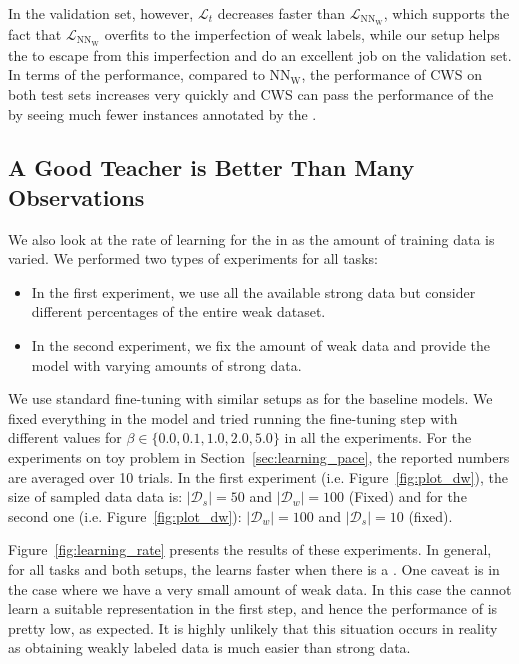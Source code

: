 In the validation set, however, $\mathcal{L}_t$ decreases faster than $\mathcal{L}_{\text{NN}_{\text{W}}}$, which supports the fact that $\mathcal{L}_{\text{NN}_{\text{W}}}$ overfits to the imperfection of weak labels, while our setup helps the \tnet to escape from this imperfection and do an excellent job on the validation set.
%
In terms of the performance, compared to $\text{NN}_{\text{W}}$, the performance of CWS on both test sets increases very quickly and CWS can pass the performance of the \wa by seeing much fewer instances annotated by the \wa.
\subsection{A Good Teacher is Better Than Many Observations} 

We also look at the rate of learning for the \std in \fwl as the amount of training data is varied. We performed two types of experiments for all tasks:
%
\begin{itemize}
    \item In the first experiment, we use all the available strong data but consider different percentages of the entire weak dataset.
    \item In the second experiment, we fix the amount of weak data and provide the model with varying amounts of strong data.
\end{itemize} 
We use standard fine-tuning with similar setups as for the baseline models. 
We fixed everything in the model and tried running the fine-tuning step with different values for $\beta \in \{0.0, 0.1, 1.0, 2.0, 5.0\}$ in all the experiments.
For the experiments on toy problem in Section~\ref{sec:learning_pace}, the reported numbers are averaged over 10 trials. In the first experiment (i.e. Figure~\ref{fig:plot_dw}), the size of sampled data data is: $|\mathcal{D}_s| = 50$ and $|\mathcal{D}_w| = 100$ (Fixed) and for the second one (i.e. Figure~\ref{fig:plot_dw}): $|\mathcal{D}_w| = 100$ and $|\mathcal{D}_s| = 10$ (fixed). 


Figure~\ref{fig:learning_rate} presents the results of these experiments. In general, for all tasks and both setups, the \std learns faster when there is a \tch.
One caveat is in the case where we have a very small amount of weak data. In this case the \std cannot learn a suitable representation in the first step, and hence the performance of \fwl is pretty low, as expected. It is highly unlikely that this situation occurs in reality as obtaining weakly labeled data is much easier than strong data.

